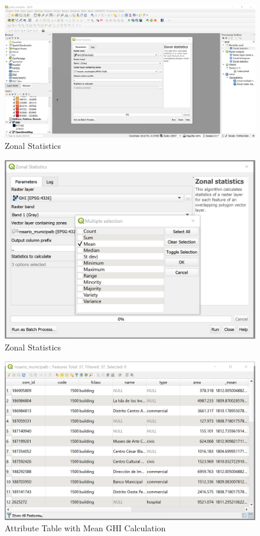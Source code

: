 \documentclass[
]{book}
\begin{document}
\begin{figure}

{\centering \includegraphics[width=1\linewidth]{images/processing2} 

}

\caption{Zonal Statistics}\label{fig:img-181}
\end{figure}
\begin{figure}

{\centering \includegraphics[width=0.7\linewidth]{images/processing3} 

}

\caption{Zonal Statistics}\label{fig:img-182}
\end{figure}
\begin{figure}

{\centering \includegraphics[width=1\linewidth]{images/processing4} 

}

\caption{Attribute Table with Mean GHI Calculation}\label{fig:img-183}
\end{figure}
\end{document}
